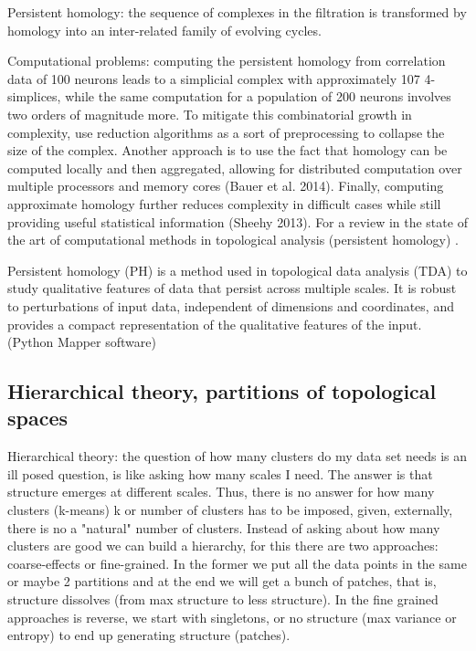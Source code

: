 \documentclass[onecollarge,runningheads]{svjour2}
\begin{document}
Persistent homology:  the sequence of complexes in the filtration is transformed by homology into an inter-related family of evolving cycles.

Computational problems: computing the persistent homology from correlation data of 100 neurons leads to a simplicial complex with approximately 107 4-simplices, while the same computation for a population of 200 neurons involves two orders of magnitude more.
To mitigate this combinatorial growth in complexity, use reduction algorithms as a sort of preprocessing to collapse the size of the complex.
Another approach is to use the fact that homology can be computed locally and then aggregated, allowing for distributed computation over multiple processors and memory cores (Bauer et al. 2014). Finally, computing approximate homology further reduces complexity in difficult cases while still providing useful statistical information (Sheehy 2013). 
For a review in the state of the art of computational methods in topological analysis (persistent homology) \citep{otter2015roadmap}.

Persistent homology (PH) is a method used in topological data analysis (TDA) to study qualitative features of data that persist across multiple scales. It is robust to perturbations of input data, independent of dimensions and coordinates, and provides a compact representation of the qualitative features of the input. (Python Mapper software) 

\subsection{Hierarchical theory, partitions of topological spaces }
\label{sec:2}

Hierarchical theory: the question of how many clusters do my data set needs is an ill posed question, is like asking how many scales I need. The answer is that structure emerges at different scales. Thus, there is no answer for how many clusters (k-means) k or number of clusters has to be imposed, given, externally, there is no a "natural" number of clusters. Instead of asking about how many clusters are good we can build a hierarchy, for this there are two approaches: coarse-effects or fine-grained.
In the former we put all the data points in the same or maybe 2 partitions and at the end we will get a bunch of patches, that is, structure dissolves (from max structure to less structure). In the fine grained approaches is reverse, we start with singletons, or no structure (max variance or entropy) to end up generating structure (patches).
 
\end{document}
